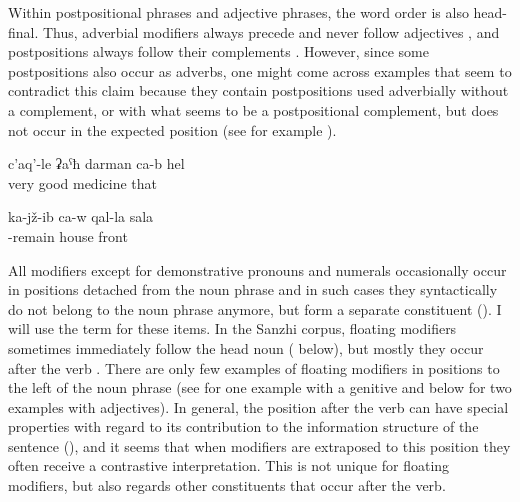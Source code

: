 Within postpositional phrases and adjective phrases, the word order is also head-final. Thus, adverbial modifiers always precede and never follow adjectives , and postpositions always follow their complements . However, since some postpositions also occur as adverbs, one might come across examples that seem to contradict this claim because they contain postpositions used adverbially without a complement, or with what seems to be a postpositional complement, but does not occur in the expected position (see  for example ).
%
\begin{exe}
	\ex	\label{ex:That is a very good medicine}
	\gll	c'aq'-le	ʡaˁħ	darman	ca-b	hel\\
		very	good	medicine		that\\
	\glt	{}

	\ex	\label{ex:He is sitting in front of the house}
	\gll	ka-jž-ib	ca-w	qal-la	sala\\
		-remain		house	front\\
	\glt	{}
\end{exe}

All modifiers except for demonstrative pronouns and numerals occasionally occur in positions detached from the noun phrase and in such cases they syntactically do not belong to the noun phrase anymore, but form a separate constituent (). I will use the term  for these items. In the Sanzhi corpus, floating modifiers sometimes immediately follow the head noun ( below), but mostly they occur after the verb . There are only few examples of floating modifiers in positions to the left of the noun phrase (see  for one example with a genitive and  below for two examples with adjectives). In general, the position after the verb can have special properties with regard to its contribution to the information structure of the sentence (), and it seems that when modifiers are extraposed to this position they often receive a contrastive interpretation. This is not unique for floating modifiers, but also regards other constituents that occur after the verb. 

